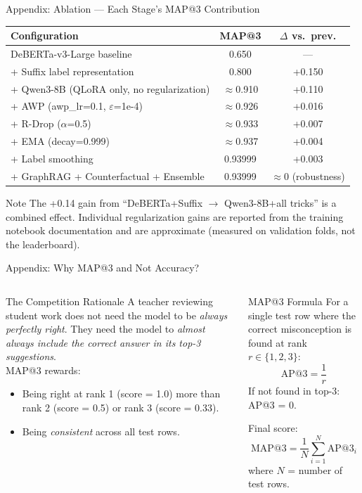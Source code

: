 ﻿\documentclass[aspectratio=169,10pt]{beamer}
\begin{document}
\begin{frame}{Appendix: Ablation --- Each Stage's MAP@3 Contribution}
\small
\begin{center}
\setlength{\tabcolsep}{8pt}
\renewcommand{\arraystretch}{1.3}
\begin{tabular}{lcc}
\toprule
\textbf{Configuration} & \textbf{MAP@3} & \textbf{$\Delta$ vs.\ prev.}\\
\midrule
DeBERTa-v3-Large baseline & 0.650 & ---\\
+ Suffix label representation & 0.800 & +0.150\\
+ Qwen3-8B (QLoRA only, no regularization) & $\approx$0.910 & +0.110\\
+ AWP (awp\_lr=0.1, $\varepsilon$=1e-4) & $\approx$0.926 & +0.016\\
+ R-Drop ($\alpha$=0.5) & $\approx$0.933 & +0.007\\
+ EMA (decay=0.999) & $\approx$0.937 & +0.004\\
+ Label smoothing & 0.93999 & +0.003\\
+ GraphRAG + Counterfactual + Ensemble & 0.93999 & $\approx$0 (robustness)\\
\bottomrule
\end{tabular}
\end{center}
\vspace{8pt}
\begin{block}{Note}
The +0.14 gain from ``DeBERTa+Suffix $\to$ Qwen3-8B+all tricks'' is a combined effect. Individual regularization gains are reported from the training notebook documentation and are approximate (measured on validation folds, not the leaderboard).
\end{block}
\end{frame}

\begin{frame}{Appendix: Why MAP@3 and Not Accuracy?}
\begin{columns}[T]
\begin{block}{The Competition Rationale}
A teacher reviewing student work does not need the model to be \textit{always perfectly right}. They need the model to \textit{almost always include the correct answer in its top-3 suggestions}.\\[6pt]
MAP@3 rewards:
\begin{itemize}
  \item Being right at rank 1 (score = 1.0) more than rank 2 (score = 0.5) or rank 3 (score = 0.33).
  \item Being \textit{consistent} across all test rows.
\end{itemize}
\end{block}
\begin{block}{MAP@3 Formula}
For a single test row where the correct misconception is found at rank $r \in \{1, 2, 3\}$:
\[
  \text{AP@3} = \frac{1}{r}
\]
If not found in top-3: AP@3 = 0.

Final score:
\[
  \text{MAP@3} = \frac{1}{N}\sum_{i=1}^{N} \text{AP@3}_i
\]
where $N$ = number of test rows.
\end{block}
\end{columns}
\end{frame}
\end{document}
